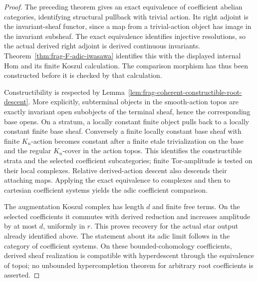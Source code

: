 \documentclass[11pt]{article}
\theoremstyle{definition}
\theoremstyle{remark}
\begin{document}
\begin{proof}
The preceding theorem gives an exact equivalence of coefficient
abelian categories, identifying structural pullback with trivial
action.  Its right adjoint is the invariant-sheaf functor, since a
map from a trivial-action object has image in the invariant subsheaf.
The exact equivalence identifies injective resolutions, so the
actual derived right adjoint is derived continuous invariants.
Theorem~\ref{thm:frag-F-adic-iwasawa} identifies this with the
displayed internal Hom and its finite Koszul calculation.  The
comparison morphism has thus been constructed before it is checked
by that calculation.

Constructibility is respected by
Lemma~\ref{lem:frag-coherent-constructible-root-descent}.  More explicitly,
subterminal objects in the
smooth-action topos are exactly invariant open subobjects of the
terminal sheaf, hence the corresponding base opens.  On a stratum,
a locally constant finite object pulls back to a locally constant
finite base sheaf.  Conversely a finite locally constant base sheaf
with finite $K_n$-action becomes constant after a finite etale
trivialization on the base and the regular $K_n$-cover in the action
topos.  This identifies the constructible strata and the selected
coefficient subcategories; finite Tor-amplitude is tested on their
local complexes.  Relative derived-action descent also descends their attaching maps.  Applying the exact equivalence to complexes and then to
cartesian coefficient systems yields the adic coefficient comparison.

The augmentation Koszul complex has length $d$ and finite free terms.
On the selected coefficients it commutes with derived reduction and
increases amplitude by at most $d$, uniformly in $r$.  This proves
recovery for the actual star output already identified above.  The
statement about its adic limit follows in the category of coefficient
systems.  On these bounded-cohomology coefficients, derived sheaf
realization is compatible with hyperdescent through the equivalence
of topoi; no unbounded hypercompletion theorem for arbitrary root
coefficients is asserted.
\end{proof}
\end{document}
